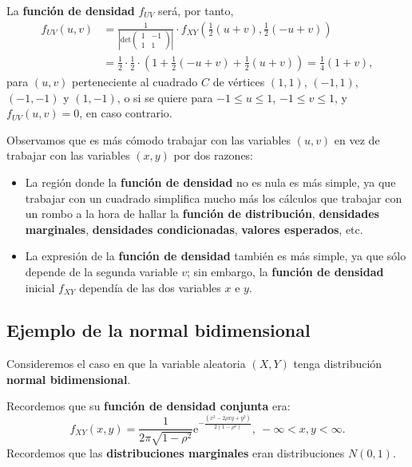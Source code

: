 \documentclass[]{book}
\providecommand{\tightlist}{%
  \setlength{\itemsep}{0pt}\setlength{\parskip}{0pt}}
\begin{document}
La \textbf{función de densidad} \(f_{UV}\) será, por tanto,
\[
\begin{array}{rl}
f_{UV}(u,v) & =\frac{1}{\left|\mathrm{det}\begin{pmatrix}1 & -1\\ 1& 1\end{pmatrix}\right|}\cdot f_{XY}\left(\frac{1}{2}(u+v),\frac{1}{2}(-u+v)\right) \\ & =\frac{1}{2}\cdot \frac{1}{2}\cdot \left(1+\frac{1}{2}(-u+v)+\frac{1}{2}(u+v)\right)=\frac{1}{4}(1+v),
\end{array}
\]
para \((u,v)\) perteneciente al cuadrado \(C\) de vértices \((1,1)\), \((-1,1)\), \((-1,-1)\) y \((1,-1)\), o si se quiere para \(-1\leq u\leq 1\), \(-1\leq v\leq 1\), y \(f_{UV}(u,v)=0\), en caso contrario.

Observamos que es más cómodo trabajar con las variables \((u,v)\) en vez de trabajar con las variables \((x,y)\) por dos razones:

\begin{itemize}
\tightlist
\item
  La región donde la \textbf{función de densidad} no es nula es más simple, ya que trabajar con un cuadrado simplifica mucho más los cálculos que trabajar con un rombo a la hora de hallar la \textbf{función de distribución}, \textbf{densidades marginales}, \textbf{densidades condicionadas}, \textbf{valores esperados}, etc.
\item
  La expresión de la \textbf{función de densidad} también es más simple, ya que sólo depende de la segunda variable \(v\); sin embargo, la \textbf{función de densidad} inicial \(f_{XY}\) dependía de las dos variables \(x\) e \(y\).
\end{itemize}

\hypertarget{ejemplo-de-la-normal-bidimensional}{%
\subsection{Ejemplo de la normal bidimensional}\label{ejemplo-de-la-normal-bidimensional}}

Consideremos el caso en que la variable aleatoria \((X,Y)\) tenga distribución \textbf{normal bidimensional}.

Recordemos que su \textbf{función de densidad conjunta} era:
\[
f_{XY}(x,y)=\frac{1}{2\pi\sqrt{1-\rho^2}}\mathrm{e}^{-\frac{(x^2-2\rho xy+y^2)}{2(1-\rho^2)}},\ -\infty <x,y<\infty.
\]
Recordemos que las \textbf{distribuciones marginales} eran distribuciones \(N(0,1)\).
\end{document}
